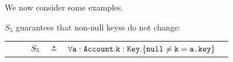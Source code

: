 We now consider some examples.

%  

{
 \begin{example}
 \label{example:twostate}
 $S_5$  guarantees   that   non-null keyss do not change:
 \\
 \begin{tabular}{lcll}
$\strut \ \ \ \ \ \ \ \ S_5$ & $\triangleq$   & ${\forall {\mbox{\normalfont{\texttt{a}}}:\mbox{\normalfont{\texttt{Account}}}.\mbox{\normalfont{\texttt{k}}}:\mbox{\normalfont{\texttt{Key}}}}.{{\{}}{\mbox{\normalfont{\texttt{null}}}\neq \mbox{\normalfont{\texttt{k}}}=\mbox{\normalfont{\texttt{a.key}}}}{{\}}}} $  \end{tabular}
 \end{example} 
 }

